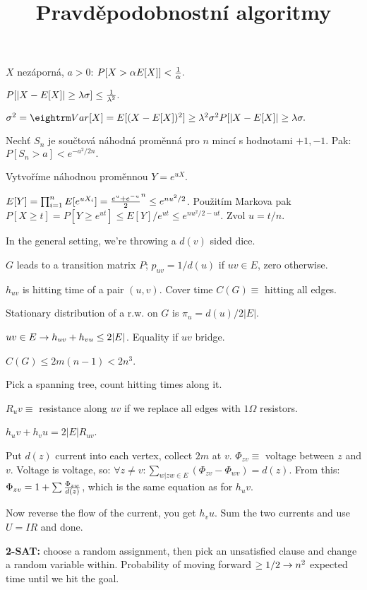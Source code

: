 

\title{Pravděpodobnostní algoritmy}

 
 $X$ nezáporná, $a > 0$:
$P[X > \alpha E[X]] < {1 \over \alpha}.$

$P[|X-E[X]| \ge \lambda\sigma] \le {1 \over \lambda^2}.$

\prf{}
$\sigma^2 = \var[X] = E[(X - E[X])^2] \ge \lambda^2 \sigma^2 P[|X-E[X]| \ge \lambda\sigma. $

 Nechť $S_n$ je součtová náhodná proměnná pro $n$ mincí s hodnotami ${+1,-1}$. Pak:
$P[S_n > a] < e^{-a^2 / 2n}.$

\prf{} Vytvoříme náhodnou proměnnou $Y = e^{uX}$.

$E[Y] = \prod_{i=1}^n E[e^{uX_i}] = {e^u + e^{-u} \over 2}^n \le e^{nu^2/2}$. Použitím Markova pak
$P[X \ge t] = P[Y \ge e^{ut}] \le E[Y] / e^{ut} \le e^{nu^2/2 - ut}$. Zvol $u =
t/n$.


In the general setting, we're throwing a $d(v)$ sided dice.

\dfn{} $G$ leads to a transition matrix $P$; $p_{uv} = 1/d(u)$ if $uv \in E$, zero otherwise.

\dfn{} $h_{uv}$ is hitting time of a pair $(u,v)$. Cover time $C(G) \equiv$ hitting all edges.

\thm{} Stationary distribution of a r.w. on $G$ is $\pi_{u} = d(u)/2|E|$. 

\thm{} $uv \in E \rightarrow h_{uv} + h_{vu} \le 2|E|$. Equality if $uv$ bridge.

\thm{} $C(G) \le  2m(n-1) < 2n^3$. 

\prf{} Pick a spanning tree, count hitting times along it.

\dfn{} $R_uv \equiv$ resistance along $uv$ if we replace all edges with $1\Omega$ resistors.

\thm{} $h_uv + h_vu = 2|E|R_{uv}$.

\prf{} Put $d(z)$ current into each vertex, collect $2m$ at $v$.
$\Phi_{zv} \equiv$ voltage between $z$ and $v$. Voltage is voltage, so:
$\forall z \ne v:  \sum_{w|zw \in E}(\Phi_{zv} - \Phi_{wv}) = d(z)$. From this:
$\Phi_{zv} = 1 + \sum {\Phi_{zw} \over d(z)}$, which is the same equation as
for $h_uv$.

Now reverse the flow of the current, you get $h_vu$. Sum the two currents and
use $U=IR$ and done.

{\bf 2-SAT:} choose a random assignment, then pick an unsatisfied clause and
change a random variable within. Probability of moving forward $\ge 1/2 \rightarrow
n^2$ expected time until we hit the goal.

